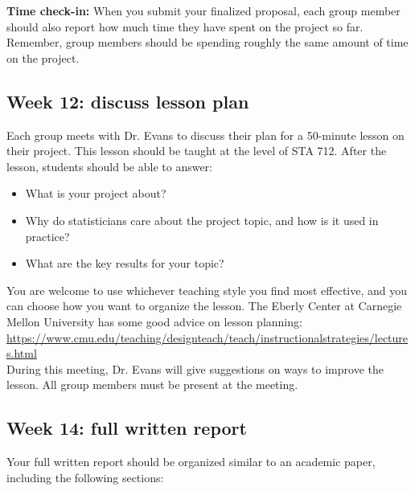 \documentclass[11pt]{article}
\begin{document}
\noindent \textbf{Time check-in:} When you submit your finalized proposal, each group member should also report how much time they have spent on the project so far. Remember, group members should be spending roughly the same amount of time on the project.

\vspace{0.5cm}

\subsection*{Week 12: discuss lesson plan}

Each group meets with Dr. Evans to discuss their plan for a 50-minute lesson on their project. This lesson should be taught at the level of STA 712. After the lesson, students should be able to answer:

\begin{itemize}
\item What is your project about?

\item Why do statisticians care about the project topic, and how is it used in practice?

\item What are the key results for your topic?
\end{itemize}

\noindent You are welcome to use whichever teaching style you find most effective, and you can choose how you want to organize the lesson. The Eberly Center at Carnegie Mellon University has some good advice on lesson planning: \\

\noindent \url{https://www.cmu.edu/teaching/designteach/teach/instructionalstrategies/lectures.html}\\

\noindent During this meeting, Dr. Evans will give suggestions on ways to improve the lesson. All group members must be present at the meeting.

\vspace{0.5cm}

\subsection*{Week 14: full written report}

Your full written report should be organized similar to an academic paper, including the following sections:
\end{document}
